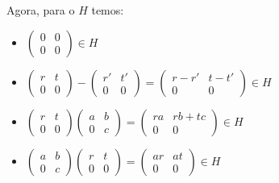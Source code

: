 \documentclass[10pt,a4paper]{article}
\begin{document}
\medskip
\noindent
Agora, para o $H$ temos:
\begin{itemize}
\item $\begin{pmatrix}
0&0\\0&0
\end{pmatrix}\in H$
\item $\begin{pmatrix}
r&t\\0&0
\end{pmatrix}-\begin{pmatrix}
r'&t'\\0&0
\end{pmatrix}=\begin{pmatrix}
r-r'&t-t'\\0&0
\end{pmatrix}\in H$
\item $\begin{pmatrix}
r&t\\0&0
\end{pmatrix}\begin{pmatrix}
a&b\\0&c
\end{pmatrix}=\begin{pmatrix}
ra&rb+tc\\0&0
\end{pmatrix}\in H$
\item $\begin{pmatrix}
a&b\\0&c
\end{pmatrix}\begin{pmatrix}
r&t\\0&0
\end{pmatrix}=\begin{pmatrix}
ar&at\\0&0
\end{pmatrix}\in H$
\end{itemize}
\end{document}
